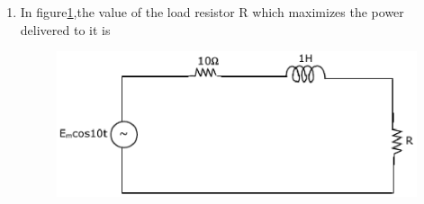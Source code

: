 \documentclass[journal,12pt,twocolumn]{IEEEtran}
\begin{document}
\begin{enumerate}
\item In figure\ref{fig38},the value of the load resistor R which maximizes the power delivered to it is
\begin{enumerate}
\setlength\itemsep{2em}
\begin{figure}[!h]
\begin{center}
\includegraphics[scale=0.5]{./figs/fig38.eps}
\caption{}
\label{fig38}
\end{center}
\end{figure}
\end{enumerate}


\end{enumerate}
\end{document}
